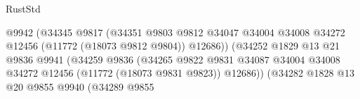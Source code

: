 \begin{lexlean}{RustStd}
\begin{coremodule}
                                                        @9942
                                                        (@34345
                                                          @9817
                                                          (@34351
                                                            @9803
                                                            @9812
                                                            @34047
                                                            @34004
                                                            @34008
                                                            @34272
                                                            @12456
                                                            (@11772 (@18073 @9812 @9804))
                                                            @12686))
                                                        (@34252
                                                          @1829
                                                          @13
                                                          @21
                                                          @9836
                                                          @9941
                                                          (@34259
                                                            @9836
                                                            (@34265
                                                              @9822
                                                              @9831
                                                              @34087
                                                              @34004
                                                              @34008
                                                              @34272
                                                              @12456
                                                              (@11772 (@18073 @9831 @9823))
                                                              @12686))
                                                          (@34282
                                                            @1828
                                                            @13
                                                            @20
                                                            @9855
                                                            @9940
                                                            (@34289
                                                              @9855

\end{coremodule}
\end{lexlean}
